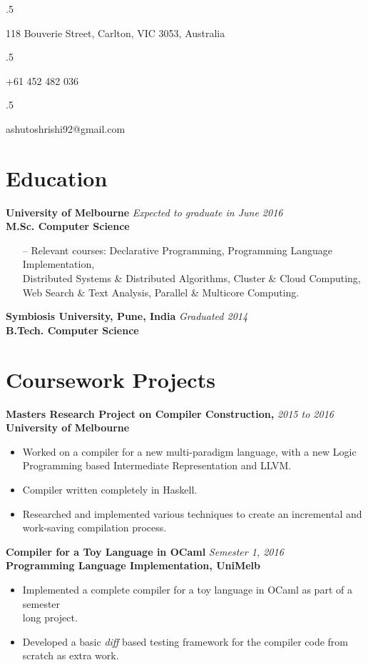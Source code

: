 \documentclass[a4paper,overlapped]{res}
\begin{document}


\begin{resume}
  \moveleft.5\hoffset\centerline{118 Bouverie Street, Carlton, VIC 3053, Australia}
  \moveleft.5\hoffset\centerline{+61 452 482 036}
  \moveleft.5\hoffset\centerline{ashutoshrishi92@gmail.com}

  \section{Education}  
  \textbf{University of Melbourne} \hfill \textit{Expected to graduate in June 2016} \\
  \textbf{M.Sc. Computer Science }
  \begin{itemize} \itemsep -2pt
  \item[--] Relevant courses: Declarative Programming, Programming Language
    Implementation, \\ Distributed Systems \& Distributed Algorithms, Cluster
    \& Cloud Computing,\\ Web Search \& Text Analysis, Parallel \& Multicore
    Computing.
  \end{itemize}

  \textbf{Symbiosis University, Pune, India} \hfill \textit{Graduated 2014} \\
  \textbf{B.Tech. Computer Science }


  \section{Coursework Projects}
  
  \textbf{Masters Research Project on Compiler Construction,} \hfill
  \textit{2015 to 2016}\\
  \textbf{University of Melbourne}
  \begin{itemize}
  \item Worked on a compiler for a new multi-paradigm language, with a new
    Logic \\ Programming based Intermediate Representation and LLVM.
  \item Compiler written completely in Haskell.
  \item Researched and implemented various techniques to create an incremental
    and \\work-saving compilation process.
  \end{itemize}

  \textbf{Compiler for a Toy Language in OCaml} \hfill \textit{Semester 1,
    2016}\\
  \textbf{Programming Language Implementation, UniMelb}
  \begin{itemize}
  \item Implemented a complete compiler for a toy language in OCaml as part of
    a semester\\ long project.
  \item Developed a basic \textit{diff} based testing framework for the
    compiler code from\\ scratch as extra work.
  \end{itemize}
  


\end{resume}
\end{document}
